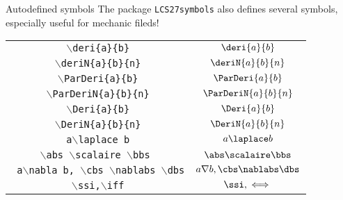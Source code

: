 \documentclass[aspectratio=169]{beamer}
\begin{document}
\begin{frame}{Autodefined symbols}
The package \texttt{LCS27symbols} also defines several symbols, especially useful for mechanic fileds!
\begin{table}[h]
\centering
\begin{tabular}{|c|c|}
\hline
\texttt{$\backslash$deri\{a\}\{b\}} &  $\deri{a}{b}$\\
\texttt{$\backslash$deriN\{a\}\{b\}\{n\}}& $\deriN{a}{b}{n}$\\
\texttt{$\backslash$ParDeri\{a\}\{b\}} & $     \ParDeri{a}{b}    $\\
\texttt{$\backslash$ParDeriN\{a\}\{b\}\{n\}} & $     \ParDeriN{a}{b}{n}    $\\
\texttt{$\backslash$Deri\{a\}\{b\}}& $     \Deri{a}{b}   $\\
\texttt{$\backslash$DeriN\{a\}\{b\}\{n\}}& $     \DeriN{a}{b}{n}   $\\
\texttt{    a$\backslash$laplace b   }& $     a\laplace b   $\\
\texttt{$\backslash$abs $\backslash$scalaire $\backslash$bbs   }& $     \abs \scalaire \bbs   $\\
\texttt{    a$\backslash$nabla b, $\backslash$cbs $\backslash$nablabs $\backslash$dbs} & $      a \nabla b, \cbs \nablabs \dbs   $\\
\texttt{    $\backslash$ssi,$\backslash$iff } & $     \ssi,\iff $\\
\hline
\end{tabular}
\end{table}
\end{frame}
\end{document}
